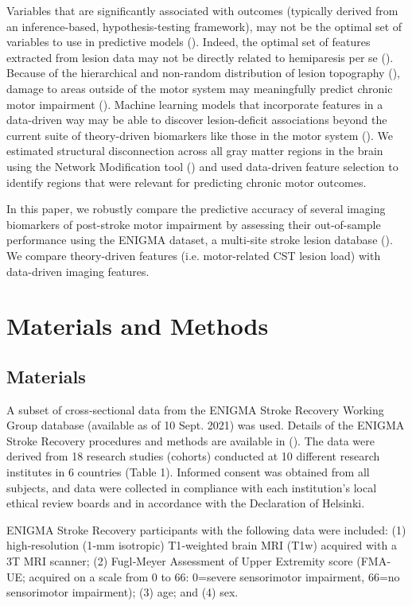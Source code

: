 \documentclass[10pt]{article}
\begin{document}
Variables that are significantly associated with outcomes (typically derived from an inference-based, hypothesis-testing framework), may not be the optimal set of variables to use in predictive models (\cite{Bzdok2020-py}). Indeed, the optimal set of features extracted from lesion data may not be directly related to hemiparesis per se (\cite{Sperber2021-lw}). Because of the hierarchical and non-random distribution of lesion topography (\cite{Mah2014-cb,Wang2019-dz}), damage to areas outside of the motor system may meaningfully predict chronic motor impairment (\cite{Sperber2021-lw}). Machine learning models that incorporate features in a data-driven way may be able to discover lesion-deficit associations beyond the current suite of theory-driven biomarkers like those in the motor system (\cite{Kasties2021-rm, Calesella2021-kp}). We estimated structural disconnection across all gray matter regions in the brain using the Network Modification tool (\cite{Kuceyeski2013-nk}) and used data-driven feature selection to identify regions that were relevant for predicting chronic motor outcomes. 



In this paper, we robustly compare the predictive accuracy of several imaging biomarkers of post-stroke motor impairment by assessing their out-of-sample performance using the ENIGMA dataset, a multi-site stroke lesion database (\cite{Liew2020-ps}). We compare theory-driven features (i.e. motor-related CST lesion load) with data-driven imaging features. 


\section{Materials and Methods}
\subsection{Materials}
A subset of cross‐sectional data from the ENIGMA Stroke Recovery Working Group database (available as of 10 Sept. 2021) was used. Details of the ENIGMA Stroke Recovery procedures and methods are available in (\cite{Liew2020-ps}). The data were derived from 18 research studies (cohorts) conducted at 10 different research institutes in 6 countries (Table 1). Informed consent was obtained from all subjects, and data were collected in compliance with each institution’s local ethical review boards and in accordance with the Declaration of Helsinki.

ENIGMA Stroke Recovery participants with the following data were included: (1) high‐resolution (1‐mm isotropic) T1‐weighted brain MRI (T1w) acquired with a 3T MRI scanner; (2) Fugl‐Meyer Assessment of Upper Extremity score (FMA‐UE; acquired on a scale from 0 to 66: 0=severe sensorimotor impairment, 66=no sensorimotor impairment); (3) age; and (4) sex.
\end{document}
